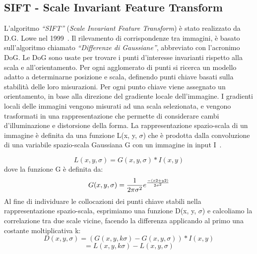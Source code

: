 \subsection{SIFT - Scale Invariant Feature Transform}
\noindent L'algoritmo \textit{``SIFT''} (\textit{Scale Invariant Feature Transform}) è stato realizzato da D.G. Lowe nel 1999~\cite{Lowe2004}. Il rilevamento di corrispondenze tra immagini, è basato sull'algoritmo chiamato \textit{``Differenze di Gaussiane''}, abbreviato con l'acronimo DoG. Le DoG sono usate per trovare i punti d'interesse invarianti rispetto alla scala e all'orientamento. Per ogni agglomerato di punti si ricerca un modello adatto a determinarne posizione e scala, definendo punti chiave basati sulla stabilità delle loro misurazioni. Per ogni punto chiave viene assegnato un orientamento, in base alla direzione del gradiente locale dell'immagine. I gradienti locali delle immagini vengono misurati ad una scala selezionata, e vengono trasformati in una rappresentazione che permette di considerare cambi d'illuminazione e distorsione della forma.\hfill \break
\noindent La rappresentazione spazio-scala di un immagine è definita da una funzione L(x, y, \(\sigma\)) che è prodotta dalla convoluzione di una variabile spazio-scala Gaussiana G con un immagine in input I~\cite{Lowe2004}. \par
\begin{equation}
	L(x, y, \sigma) = G(x, y, \sigma) * I(x, y)
\end{equation}
\noindent dove la funzione G è definita da:
\begin{equation}
    G(x, y, \sigma) = \frac{1}{2\pi\sigma^2}e^\frac{-(x2+y2)}{2\sigma^2}
\end{equation}
\noindent
Al fine di individuare le collocazioni dei punti chiave stabili nella rappresentazione spazio-scala, esprimiamo una funzione D(x, y, \(\sigma\)) e calcoliamo la correlazione tra due scale vicine, facendo la differenza applicando al primo una costante moltiplicativa k:
\begin{equation}
	D(x, y, \sigma) = (G(x, y, k\sigma) - G(x, y, \sigma)) * I(x, y)
\end{equation}
\begin{equation}
    = L(x, y, k\sigma) - L(x, y, \sigma)
\end{equation}
